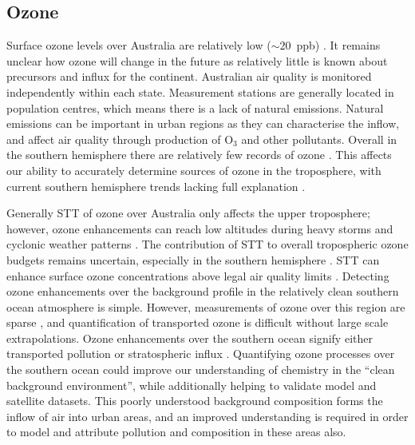   \subsection{Ozone}
    Surface ozone levels over Australia are relatively low ($\sim20$~ppb) \parencite{Young2018}.
    It remains unclear how ozone will change in the future as relatively little is known about precursors and influx for the continent.
    Australian air quality is monitored independently within each state. %
    Measurement stations are generally located in population centres, which means there is a lack of natural emissions.%
    Natural emissions can be important in urban regions as they can characterise the inflow, and affect air quality through production of O$_3$ and other pollutants.
    Overall in the southern hemisphere there are relatively few records of 
    ozone \parencite{Huang2018}.
    This affects our ability to accurately determine sources of ozone in the 
    troposphere, with current southern hemisphere trends lacking full 
    explanation \parencite{Zeng2017}. 
    
    
    Generally STT of ozone over Australia only affects the upper troposphere; however, ozone enhancements can reach low altitudes during heavy storms and cyclonic weather patterns \parencite{Alexander2013}.
    The contribution of STT to overall tropospheric ozone budgets remains uncertain, especially in the southern hemisphere \parencite{Skerlak2014}.
    STT can enhance surface ozone concentrations above legal air quality limits 
    \parencite[e.g.,][]{Lelieveld2009,Lin2015}.
    Detecting ozone enhancements over the background profile in the relatively clean southern ocean atmosphere is simple.
    However, measurements of ozone over this region are sparse \parencite{Skerlak2014}, and quantification of transported ozone is difficult without large scale extrapolations.
    Ozone enhancements over the southern ocean signify either transported pollution or stratospheric influx \parencite{Jacobson2000}.
    Quantifying ozone processes over the southern ocean could improve our understanding of chemistry in the ``clean background environment'', while additionally helping to validate model and satellite datasets.
    This poorly understood background composition forms the inflow of air into urban areas, and an improved understanding is required in order to model and attribute pollution and composition in these areas also.
  
